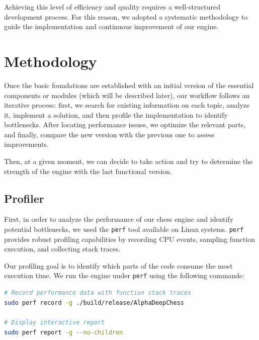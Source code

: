 \vspace{1em}

\noindent Achieving this level of efficiency and quality requires a well-structured development process. For this reason, we adopted a systematic methodology to guide the implementation and continuous improvement of our engine.

\section{Methodology}

Once the basic foundations are established with an initial version of the essential components or modules (which will be described later), our workflow follows an iterative process: first, we search for existing information on each topic, analyze it, implement a solution, and then profile the implementation to identify bottlenecks. After locating performance issues, we optimize the relevant parts, and finally, compare the new version with the previous one to assess improvements.

\vspace{1em}

\noindent Then, at a given moment, we can decide to take action and try to determine the strength of the engine with the last functional version.

\subsection{Profiler}

First, in order to analyze the performance of our chess engine and identify potential bottlenecks, we used the \texttt{perf} tool available on Linux systems. \texttt{perf} provides robust profiling capabilities by recording CPU events, sampling function execution, and collecting stack traces.

\vspace{1em}

\noindent Our profiling goal is to identify which parts of the code consume the most execution time. We run the engine under \texttt{perf} using the following commands:

\begin{lstlisting}[language=bash, caption={Profiling AlphaDeepChess with perf}, frame=single, breaklines=true]
# Record performance data with function stack traces
sudo perf record -g ./build/release/AlphaDeepChess

# Display interactive report
sudo perf report -g --no-children
\end{lstlisting}

